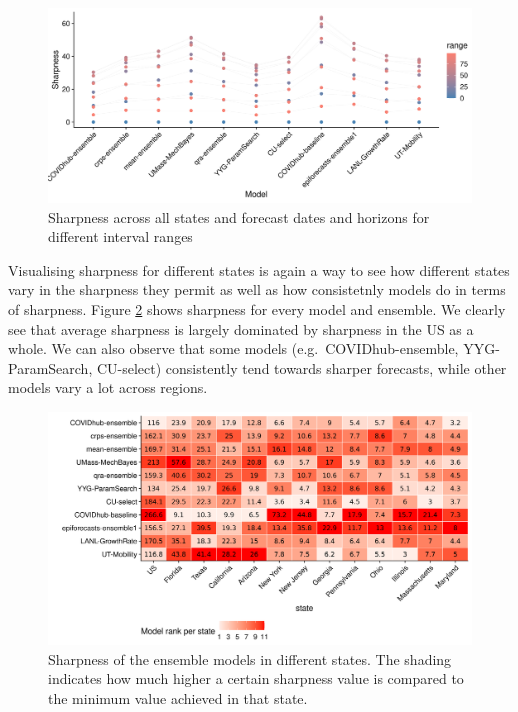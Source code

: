 \documentclass[
]{book}
\begin{document}
\begin{figure}
\includegraphics[width=1\linewidth]{../visualisation/chapter-5-results/sharpness-by-range} \caption{Sharpness across all states and forecast dates and horizons for different interval ranges}\label{fig:sharpness-ranges}
\end{figure}

Visualising sharpness for different states is again a way to see how different states vary in the sharpness they permit as well as how consistetnly models do in terms of sharpness. Figure \ref{fig:sharpness-ensemble} shows sharpness for every model and ensemble. We clearly see that average sharpness is largely dominated by sharpness in the US as a whole. We can also observe that some models (e.g.~COVIDhub-ensemble, YYG-ParamSearch, CU-select) consistently tend towards sharper forecasts, while other models vary a lot across regions.

\begin{figure}
\includegraphics[width=1\linewidth]{../visualisation/chapter-5-results/scenario-baseline/heatmap-model-sharpness} \caption{Sharpness of the ensemble models in different states. The shading indicates how much higher a certain sharpness value is compared to the minimum value achieved in that state.}\label{fig:sharpness-ensemble}
\end{figure}
\end{document}

